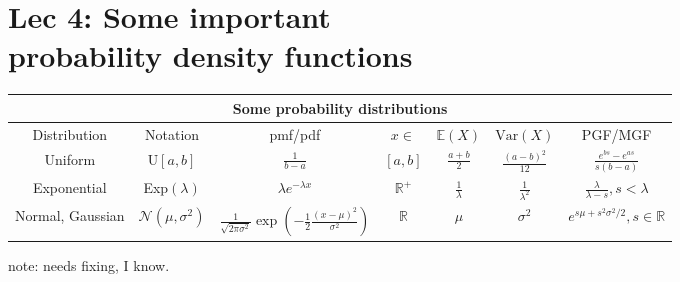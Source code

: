 \chapter[Lec 4: Some important probability density functions]{Lec 4: Some important \\probability density functions}

\begin{tabular}{ |c|c||c|c|c|c|c|  }
    \hline
    \multicolumn{7}{|c|}{Some probability distributions} \\
    \hline
    Distribution & Notation & pmf/pdf & \(x\in\) & \(\mathbb{E}(X)\)& \(\text{Var}(X)\) & PGF/MGF\\
    \hline
    Uniform & U\([a,b]\) & \(\frac{1}{b-a}\) & \([a,b]\) & \(\frac{a+b}{2}\) & \(\frac{{\left(a-b\right)}^2}{12}\) & \(\frac{e^{bs}-e^{as}}{s(b-a)}\)\\
    Exponential & Exp\((\lambda)\) & \(\lambda e^{-\lambda x}\) & \(\mathbb{R}^+\) & \(\frac{1}{\lambda}\)& \(\frac{1}{\lambda^2}\) & \(\frac{\lambda}{\lambda - s}, s<\lambda\)\\
    Normal, Gaussian & \(\mathcal{N}(\mu,\sigma^2)\) & \(\frac{1}{\sqrt{2\pi\sigma^2}}\exp\left(-\frac{1}{2}\frac{{(x-\mu)}^2}{\sigma^2}\right)\) & \(\mathbb{R}\) & \(\mu\)& \(\sigma^2\) & \(e^{s\mu+s^2\sigma^2/2}, s\in\mathbb{R}\)\\
    \hline
\end{tabular}

note: needs fixing, I know. 